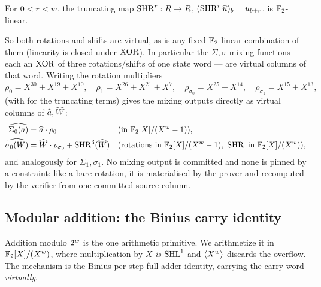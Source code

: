 \begin{lemma}
\label{lem:shr}
For $0<r<w$, the truncating map $\operatorname{SHR}^{r}:R\to R$,
$(\operatorname{SHR}^r\widehat{u})_b = u_{b+r}$, is $\mathbb{F}_2$-linear.
\end{lemma}

So both rotations and shifts are virtual, as is any fixed $\mathbb{F}_2$-linear
combination of them (linearity is closed under $\operatorname{XOR}$). In particular the
$\Sigma,\sigma$ mixing functions --- each an $\operatorname{XOR}$ of three rotations/shifts of
one state word --- are virtual columns of that word. Writing the rotation
multipliers
\[
  \rho_{0} = X^{30}+X^{19}+X^{10},\quad
  \rho_{1} = X^{26}+X^{21}+X^{7},\quad
  \rho_{\sigma_0} = X^{25}+X^{14},\quad
  \rho_{\sigma_1} = X^{15}+X^{13},
\]
 (with  for the truncating terms) gives the mixing
outputs directly as virtual columns of $\widehat{a},\widehat{W}$:
\begin{align}
  \widehat{\Sigma_0(a)} &= \widehat{a}\cdot\rho_0 && (\text{in } \mathbb{F}_2[X]/(X^{w}-1)),
  \label{eq:Sigma}\\
  \widehat{\sigma_0(W)} &= \widehat{W}\cdot\rho_{\sigma_0} + \operatorname{SHR}^{3}(\widehat{W})
  && (\text{rotations in } \mathbb{F}_2[X]/(X^{w}-1),\ \operatorname{SHR} \text{ in } \mathbb{F}_2[X]/(X^{w})),
  \label{eq:sigma}
\end{align}
and analogously for $\Sigma_1,\sigma_1$. No mixing output is committed and none
is pinned by a constraint: like a bare rotation, it is materialised by the
prover and recomputed by the verifier from one committed source column.

\subsection{Modular addition: the Binius carry identity}
\label{sec:add}

Addition modulo $2^{w}$ is the one arithmetic primitive. We arithmetize it
in $\mathbb{F}_2[X]/(X^{w})$, where multiplication by $X$ \emph{is} $\operatorname{SHL}^{1}$ and
$\langle X^{w} \rangle$ discards the overflow. The mechanism is the Binius per-step
full-adder identity, carrying the carry word \emph{virtually}.

